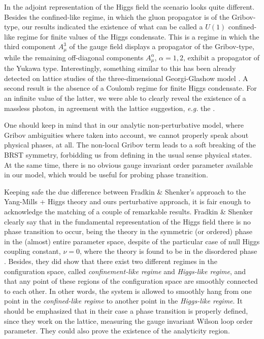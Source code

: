 In the adjoint representation of the Higgs field the scenario looks quite different. Besides
the confined-like regime, in which the gluon propagator is of the Gribov-type, our results
indicated the existence of what can be called a $U(1)$ confined-like regime for finite values
of the Higgs condensate. This is a regime in which the third component $A^3_\mu$ of the gauge
field  displays a propagator of the Gribov-type, while the remaining off-diagonal components
$A^{\alpha}_\mu$, $\alpha=1,2$, exhibit a propagator of the Yukawa type. Interestingly,
something similar to this has been already detected on lattice studies of the three-dimensional
Georgi-Glashow model \cite{Nadkarni:1989na,Hart:1996ac}. A second result is the absence of a
Coulomb regime for finite Higgs condensate. For an infinite value of the latter, we were able
to clearly reveal the existence of a massless photon, in agreement with the lattice suggestion,
\emph{e.g.} the \cite{Brower:1982yn}.

One should keep in mind that in our analytic non-perturbative model, where Gribov ambiguities
where taken into account, we cannot properly speak about physical phases, at all. The non-local
Gribov term leads to a soft breaking of the BRST symmetry, forbidding us from defining in the
usual sense physical states. At the same time, there is no obvious gauge invariant order
parameter available in our model, which would be useful for probing phase transition.

Keeping safe the due difference between Fradkin \& Shenker's approach to the Yang-Mills + Higgs
theory and ours perturbative approach, it is fair enough to acknowledge the matching of a
couple of remarkable results. Fradkin \& Shenker clearly say that in the fundamental
representation of the Higgs field there is no phase transition to occur, being the theory in
the symmetric (or ordered) phase in the (almost) entire parameter space, despite of the
particular case of null Higgs coupling constant, $\nu =0$, where the theory is found to be in
the disordered phase  \cite{Fradkin:1978dv}. Besides, they did show that there exist two
different regimes in the configuration space, called \emph{confinement-like regime} and
\emph{Higgs-like regime}, and that any point of these regions of the configuration space are
smoothly connected to each other. In other words, the system is allowed to smoothly hang from
one point in the \emph{confined-like regime} to another point in the \emph{Higgs-like regime}.
It should be emphasized that in their case a phase transition is properly defined, since they
work on the lattice, measuring the gauge invariant Wilson loop order parameter. They could also
prove the existence of the analyticity region.

%











